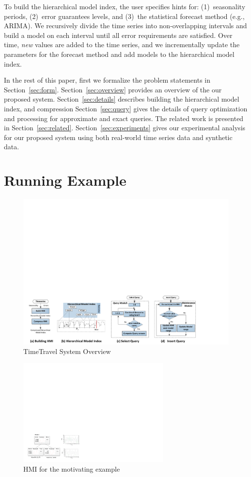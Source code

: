 To build the hierarchical model index, the user specifies hints for: (1)~seasonality periods, (2)~error guarantees levels, and (3)~the statistical forecast method (e.g., ARIMA).  
We recursively divide the time series into non-overlapping intervals and build a model on each interval until all error requirements are satisfied. 
Over time, {\it new} values are added to the time series, and we incrementally update the parameters for the forecast method and add  models to the hierarchical model index.

In the rest of this paper, first we formalize the problem statements in Section~\ref{sec:form}.   Section~\ref{sec:overview} provides an overview of the our proposed system. Section~\ref{sec:details} describes building the hierarchical model index, and  compression Section~\ref{sec:query} gives the details of query optimization and processing for approximate and exact queries.  The  related work is presented in Section~\ref{sec:related}. Section~\ref{sec:experiments} gives  our experimental analysis for our proposed system   using  both real-world time series data and synthetic data.

\section{Running Example}
\begin{figure}[th]
\center
\includegraphics[width=6in]{figs/overview3.pdf}
\caption{TimeTravel System Overview}
\label{fig:arch}
\end{figure} 
\begin{figure}[th]
\center
\includegraphics[width=3in]{figs/example_tree.pdf}
\caption{HMI for the motivating example}
\label{fig:exampletree}
\end{figure} 


